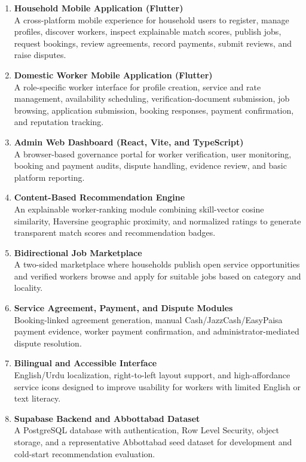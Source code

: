 \documentclass[12pt,a4paper]{article}
\begin{document}
\begin{enumerate}[label=\arabic*.,leftmargin=*,itemsep=7pt]
\item \textbf{Household Mobile Application (Flutter)}\\
A cross-platform mobile experience for household users to register, manage profiles, discover workers, inspect explainable match scores, publish jobs, request bookings, review agreements, record payments, submit reviews, and raise disputes.

\item \textbf{Domestic Worker Mobile Application (Flutter)}\\
A role-specific worker interface for profile creation, service and rate management, availability scheduling, verification-document submission, job browsing, application submission, booking responses, payment confirmation, and reputation tracking.

\item \textbf{Admin Web Dashboard (React, Vite, and TypeScript)}\\
A browser-based governance portal for worker verification, user monitoring, booking and payment audits, dispute handling, evidence review, and basic platform reporting.

\item \textbf{Content-Based Recommendation Engine}\\
An explainable worker-ranking module combining skill-vector cosine similarity, Haversine geographic proximity, and normalized ratings to generate transparent match scores and recommendation badges.

\item \textbf{Bidirectional Job Marketplace}\\
A two-sided marketplace where households publish open service opportunities and verified workers browse and apply for suitable jobs based on category and locality.

\item \textbf{Service Agreement, Payment, and Dispute Modules}\\
Booking-linked agreement generation, manual Cash/JazzCash/EasyPaisa payment evidence, worker payment confirmation, and administrator-mediated dispute resolution.

\item \textbf{Bilingual and Accessible Interface}\\
English/Urdu localization, right-to-left layout support, and high-affordance service icons designed to improve usability for workers with limited English or text literacy.

\item \textbf{Supabase Backend and Abbottabad Dataset}\\
A PostgreSQL database with authentication, Row Level Security, object storage, and a representative Abbottabad seed dataset for development and cold-start recommendation evaluation.
\end{enumerate}
\end{document}
